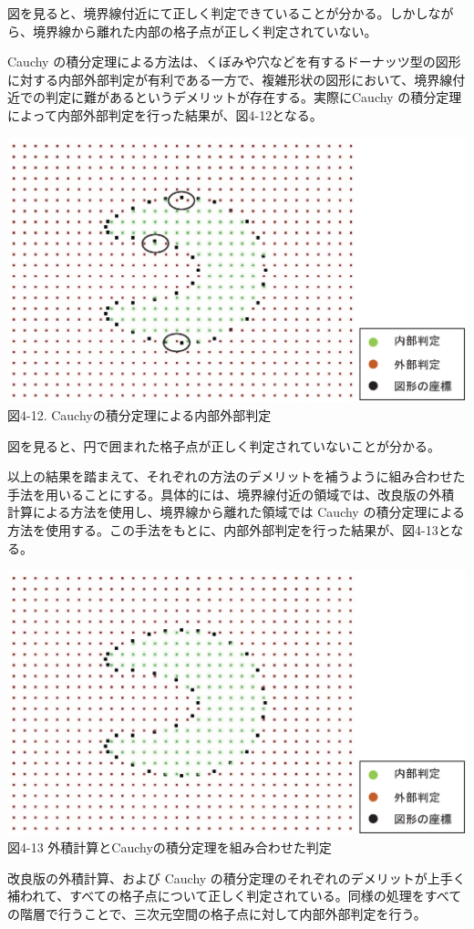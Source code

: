 図を見ると、境界線付近にて正しく判定できていることが分かる。しかしながら、境界線から離れた内部の格子点が正しく判定されていない。

Cauchy の積分定理による方法は、くぼみや穴などを有するドーナッツ型の図形に対する内部外部判定が有利である一方で、複雑形状の図形において、境界線付近での判定に難があるというデメリットが存在する。実際にCauchy の積分定理によって内部外部判定を行った結果が、図4-12となる。

\vspace{-5mm}
\begin{center}
  \includegraphics[width=14cm]{Cauchy_result.eps} \\
 \vspace{-10mm}
  図4-12. Cauchyの積分定理による内部外部判定
\end{center}

図を見ると、円で囲まれた格子点が正しく判定されていないことが分かる。

以上の結果を踏まえて、それぞれの方法のデメリットを補うように組み合わせた手法を用いることにする。具体的には、境界線付近の領域では、改良版の外積計算による方法を使用し、境界線から離れた領域では Cauchy の積分定理による方法を使用する。この手法をもとに、内部外部判定を行った結果が、図4-13となる。

\begin{center}
  \includegraphics[width=14cm]{Cross-Cauchy_result.eps} \\
 \vspace{-5mm}
  図4-13 外積計算とCauchyの積分定理を組み合わせた判定
\end{center}

改良版の外積計算、および Cauchy の積分定理のそれぞれのデメリットが上手く補われて、すべての格子点について正しく判定されている。同様の処理をすべての階層で行うことで、三次元空間の格子点に対して内部外部判定を行う。


